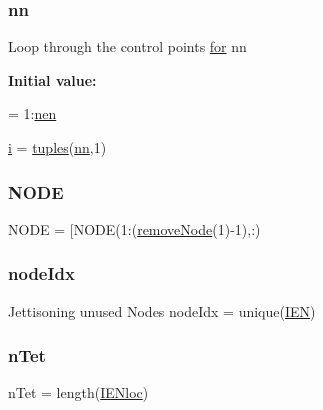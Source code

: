 \mbox{\label{a00605_a29f8cac5eb66bce13c51cf794c698f74}} 
\subsubsection{\texorpdfstring{nn}{nn}}
{\footnotesize\ttfamily Loop through the control points \hyperlink{a00623_ad1e7380d51df1e0043d24d3c8a860e0a}{for} nn}

{\bfseries Initial value\+:}
\begin{DoxyCode}
= 1:\hyperlink{a00605_acbbc42389c3587d1280ad7f1322035ba}{nen}
        
        \hyperlink{a00605_a6f6ccfcf58b31cb6412107d9d5281426}{i} = \hyperlink{a00605_ae906280b3cb956d2555d33b882cca5bf}{tuples}(\hyperlink{a00605_a29f8cac5eb66bce13c51cf794c698f74}{nn},1)
\end{DoxyCode}
\mbox{\label{a00605_a1ad005a5fea6e31be66b1791cb8dbf4d}} 
\subsubsection{\texorpdfstring{N\+O\+DE}{NODE}}
{\footnotesize\ttfamily N\+O\+DE = \mbox{[}N\+O\+DE(1\+:(\hyperlink{a00605_ae344a0a545940b078e36623bf4b44c7f}{remove\+Node}(1)-\/1),\+:)}

\mbox{\label{a00605_a3891165b790964e5812b60f12517cbe9}} 
\subsubsection{\texorpdfstring{node\+Idx}{nodeIdx}}
{\footnotesize\ttfamily Jettisoning unused Nodes node\+Idx = unique(\hyperlink{a00608_ada37e689768b959686f183a3d534464b}{I\+EN})}

\mbox{\label{a00605_a9e9784c690cbc435d91a2c0b5f2fea1c}} 
\subsubsection{\texorpdfstring{n\+Tet}{nTet}}
{\footnotesize\ttfamily n\+Tet = length(\hyperlink{a00605_ae3396d631c6896e8f9cb538bbd562cd6}{I\+E\+Nloc})}

